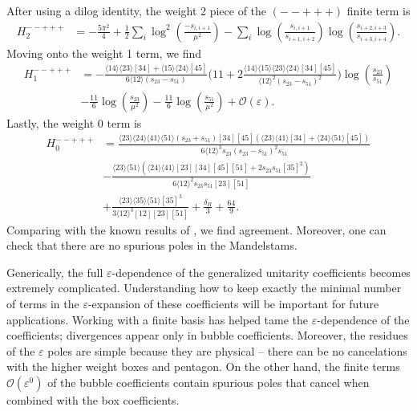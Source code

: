 \documentclass[11pt]{article}
\newcommand{\nn}{\nonumber}
\newcommand{\la}{\langle}
\newcommand{\ra}{\rangle}
\renewcommand{\O}{\mathcal{O}}
\newcommand{\vep}{\varepsilon}
\begin{document}
After using a dilog identity, the  weight 2 piece of the $(--+++)$ finite term is
\begin{align}
	H_2^{--+++}
	&= - \frac{5\pi^2}{4}+ \frac{1}{2} \sum_{i} \log^2\left(\frac{-s_{i,i+1}}{\mu^2}\right)
	- \sum_{i} \log\left(\frac{s_{i,i+1}}{s_{i+1,i+2}}\right) \log\left(\frac{s_{i+2,i+3}}{s_{i+3,i+4}}\right).
\end{align}
Moving onto the weight 1 term, we find
\begin{align}
	H_1^{--+++} &= 
	-\frac{\la14\ra\la23\ra[34]+\la15\ra\la24\ra[45]}{6\la12\ra(s_{23}-s_{51})}
		\bigg( 
			11 
			+ 2 \frac{\la14\ra\la15\ra\la23\ra\la24\ra[34][45]}{\la12\ra^2 (s_{23}-s_{51})^2}
		\bigg)
	\log\left(\frac{s_{23}}{s_{51}}\right) 
	\nn\\&
	-\frac{11}{6} \log\left(\frac{s_{23}}{\mu^2}\right)
	-\frac{11}{6} \log\left(\frac{s_{51}}{\mu^2}\right)
	+\O(\vep).
\end{align}
Lastly, the weight 0 term is
\begin{align}
		H_0^{--+++} 
		&= \frac{\la 23 \ra \la 24 \ra \la 41 \ra \la 51 \ra (s_{23}+s_{51}) [ 34 ] [ 45 ] (\la 23 \ra \la 41 \ra [ 34 ]+\la 24 \ra \la 51 \ra [ 45 ])}{6 \la12\ra^3 s_{23} (s_{23}-s_{51})^2 s_{51}}
		\nn\\&
		-\frac{\la 23 \ra \la 51 \ra \left(\la 24 \ra \la 41 \ra [ 23 ] [ 34 ] [ 45 ] [ 51 ]+2 s_{23} s_{51} [ 35 ]^2\right)}{6 \la12\ra^2 s_{23} s_{51} [ 23 ] [ 51 ]}
		\nn\\&
		+\frac{\la 23 \ra \la 35 \ra \la 51 \ra [ 35 ]^3}{3 \la12\ra^3 [ 12 ] [ 23 ] [ 51 ]}
		+\frac{\delta_R}{3}
		+\frac{64}{9}.
\end{align}
Comparing with the known results of \cite{Bern:1993mq}, we find agreement. Moreover, one can check that there are no spurious poles in the Mandelstams. 

Generically, the full $\vep$-dependence of the generalized unitarity coefficients becomes extremely complicated. Understanding how to keep exactly the minimal number of terms in the $\vep$-expansion of these coefficients will be important for future applications. Working with a finite basis has helped tame the $\vep$-dependence of the coefficients; divergences appear only in bubble coefficients. Moreover, the residues of the $\vep$ poles are simple because they are physical -- there can be no cancelations with the higher weight boxes and pentagon. On the other hand, the finite terms $\O(\vep^0)$ of the bubble coefficients contain spurious poles that cancel when combined with the box coefficients. 
\end{document}
